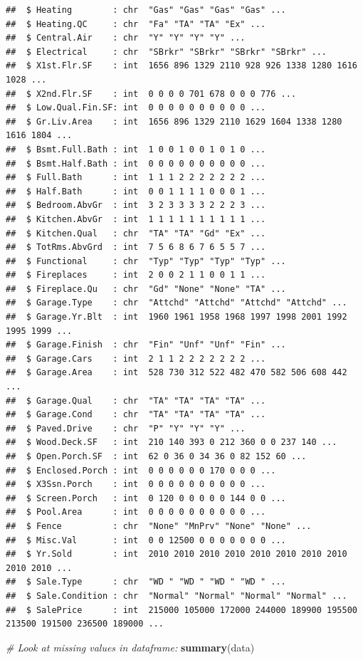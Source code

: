 \documentclass[
]{article}
\newenvironment{Shaded}{\begin{snugshade}}{\end{snugshade}}
\newcommand{\CommentTok}[1]{\textcolor[rgb]{0.56,0.35,0.01}{\textit{#1}}}
\newcommand{\KeywordTok}[1]{\textcolor[rgb]{0.13,0.29,0.53}{\textbf{#1}}}
\newcommand{\NormalTok}[1]{#1}
\begin{document}
\begin{verbatim}
##  $ Heating        : chr  "Gas" "Gas" "Gas" "Gas" ...
##  $ Heating.QC     : chr  "Fa" "TA" "TA" "Ex" ...
##  $ Central.Air    : chr  "Y" "Y" "Y" "Y" ...
##  $ Electrical     : chr  "SBrkr" "SBrkr" "SBrkr" "SBrkr" ...
##  $ X1st.Flr.SF    : int  1656 896 1329 2110 928 926 1338 1280 1616 1028 ...
##  $ X2nd.Flr.SF    : int  0 0 0 0 701 678 0 0 0 776 ...
##  $ Low.Qual.Fin.SF: int  0 0 0 0 0 0 0 0 0 0 ...
##  $ Gr.Liv.Area    : int  1656 896 1329 2110 1629 1604 1338 1280 1616 1804 ...
##  $ Bsmt.Full.Bath : int  1 0 0 1 0 0 1 0 1 0 ...
##  $ Bsmt.Half.Bath : int  0 0 0 0 0 0 0 0 0 0 ...
##  $ Full.Bath      : int  1 1 1 2 2 2 2 2 2 2 ...
##  $ Half.Bath      : int  0 0 1 1 1 1 0 0 0 1 ...
##  $ Bedroom.AbvGr  : int  3 2 3 3 3 3 2 2 2 3 ...
##  $ Kitchen.AbvGr  : int  1 1 1 1 1 1 1 1 1 1 ...
##  $ Kitchen.Qual   : chr  "TA" "TA" "Gd" "Ex" ...
##  $ TotRms.AbvGrd  : int  7 5 6 8 6 7 6 5 5 7 ...
##  $ Functional     : chr  "Typ" "Typ" "Typ" "Typ" ...
##  $ Fireplaces     : int  2 0 0 2 1 1 0 0 1 1 ...
##  $ Fireplace.Qu   : chr  "Gd" "None" "None" "TA" ...
##  $ Garage.Type    : chr  "Attchd" "Attchd" "Attchd" "Attchd" ...
##  $ Garage.Yr.Blt  : int  1960 1961 1958 1968 1997 1998 2001 1992 1995 1999 ...
##  $ Garage.Finish  : chr  "Fin" "Unf" "Unf" "Fin" ...
##  $ Garage.Cars    : int  2 1 1 2 2 2 2 2 2 2 ...
##  $ Garage.Area    : int  528 730 312 522 482 470 582 506 608 442 ...
##  $ Garage.Qual    : chr  "TA" "TA" "TA" "TA" ...
##  $ Garage.Cond    : chr  "TA" "TA" "TA" "TA" ...
##  $ Paved.Drive    : chr  "P" "Y" "Y" "Y" ...
##  $ Wood.Deck.SF   : int  210 140 393 0 212 360 0 0 237 140 ...
##  $ Open.Porch.SF  : int  62 0 36 0 34 36 0 82 152 60 ...
##  $ Enclosed.Porch : int  0 0 0 0 0 0 170 0 0 0 ...
##  $ X3Ssn.Porch    : int  0 0 0 0 0 0 0 0 0 0 ...
##  $ Screen.Porch   : int  0 120 0 0 0 0 0 144 0 0 ...
##  $ Pool.Area      : int  0 0 0 0 0 0 0 0 0 0 ...
##  $ Fence          : chr  "None" "MnPrv" "None" "None" ...
##  $ Misc.Val       : int  0 0 12500 0 0 0 0 0 0 0 ...
##  $ Yr.Sold        : int  2010 2010 2010 2010 2010 2010 2010 2010 2010 2010 ...
##  $ Sale.Type      : chr  "WD " "WD " "WD " "WD " ...
##  $ Sale.Condition : chr  "Normal" "Normal" "Normal" "Normal" ...
##  $ SalePrice      : int  215000 105000 172000 244000 189900 195500 213500 191500 236500 189000 ...
\end{verbatim}

\begin{Shaded}
\begin{Highlighting}[]
\CommentTok{# Look at missing values in dataframe:}
\KeywordTok{summary}\NormalTok{(data)}
\end{Highlighting}
\end{Shaded}
\end{document}

